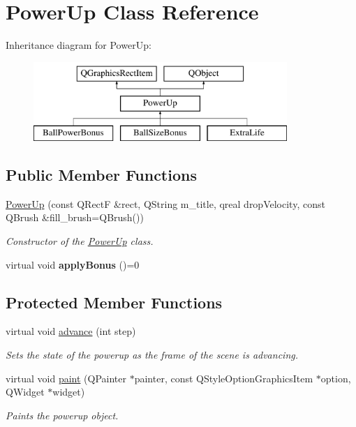 \hypertarget{class_power_up}{\section{Power\+Up Class Reference}
\label{class_power_up}
}
Inheritance diagram for Power\+Up\+:\begin{figure}[H]
\begin{center}
\leavevmode
\includegraphics[height=3.000000cm]{class_power_up}
\end{center}
\end{figure}
\subsection*{Public Member Functions}
\begin{DoxyCompactItemize}
\item 
\hyperlink{class_power_up_a0358fe89144d73b501e2720abf633481}{Power\+Up} (const Q\+Rect\+F \&rect, Q\+String m\+\_\+title, qreal drop\+Velocity, const Q\+Brush \&fill\+\_\+brush=Q\+Brush())
\begin{DoxyCompactList}\small\item\em Constructor of the \hyperlink{class_power_up}{Power\+Up} class. \end{DoxyCompactList}\item 
\hypertarget{class_power_up_aab9ea5afffada47bb0f20d8d69e41843}{virtual void {\bfseries apply\+Bonus} ()=0}\label{class_power_up_aab9ea5afffada47bb0f20d8d69e41843}

\end{DoxyCompactItemize}
\subsection*{Protected Member Functions}
\begin{DoxyCompactItemize}
\item 
virtual void \hyperlink{class_power_up_af24a16c7eba69136b408540cb0866a9b}{advance} (int step)
\begin{DoxyCompactList}\small\item\em Sets the state of the powerup as the frame of the scene is advancing. \end{DoxyCompactList}\item 
virtual void \hyperlink{class_power_up_a12700945cf46c42f38a7e5f4f18a2595}{paint} (Q\+Painter $\ast$painter, const Q\+Style\+Option\+Graphics\+Item $\ast$option, Q\+Widget $\ast$widget)
\begin{DoxyCompactList}\small\item\em Paints the powerup object. \end{DoxyCompactList}\end{DoxyCompactItemize}


